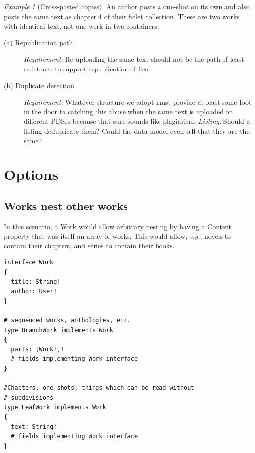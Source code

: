 \documentclass{amsart}
\theoremstyle{remark}
\newtheorem{eg}{Example}
\begin{document}
    \begin{eg}[Cross-posted copies]\label{eg:cross-post}
        An author posts a one-shot on its own and also posts the same text as chapter 4 of their ficlet collection. These are two works with identical text, not one work in two containers.
        \begin{description}
          \item[(a) Republication path] \emph{Requirement:} Re-uploading the same text should not be the path of least resistence to support republication of fics.
          \item[(b) Duplicate detection] \emph{Requirement:} Whatever structure we adopt must provide at least some foot in the door to catching this abuse when the same text is uploaded on different PDSes because that sure sounds like plagiarism.
          \emph{Listing:} Should a listing deduplicate them? Could the data model even tell that they are the same?
        \end{description}
    \end{eg}

    \section{Options}

\subsection{Works nest other works}
In this scenario, a Work would allow arbitrary nesting by having a Content property that was itself an array of works. This would allow, \textit{e.g.}, novels to contain their chapters, and series to contain their books. 
\begin{lstlisting}[frame=single,basicstyle=\small]
interface Work
{
  title: String!
  author: User!    
}

# sequenced works, anthologies, etc. 
type BranchWork implements Work
{
  parts: [Work!]!
  # fields implementing Work interface
}

#Chapters, one-shots, things which can be read without
# subdivisions
type LeafWork implements Work
{
  text: String! 
  # fields implementing Work interface
}
\end{lstlisting}
\end{document}

